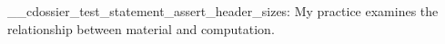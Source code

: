 \documentclass[type=artist]{careerdossier-statement}
\begin{document}
\MakeCDossierStatementHeader
\ExplSyntaxOn
\__cdossier_test_statement_assert_header_sizes:
\ExplSyntaxOff
My practice examines the relationship between material and computation.
\end{document}
